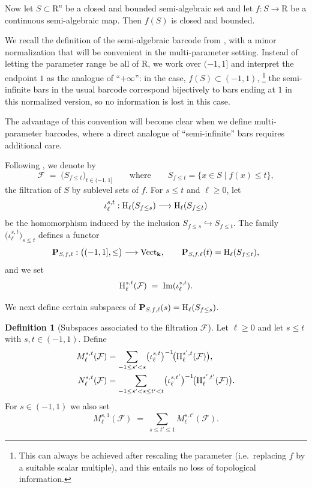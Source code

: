 \documentclass{amsart}[10pts]
\theoremstyle{definition}
\newtheorem{definition}{Definition}[section]
\theoremstyle{remark}
\theoremstyle{observation}
\numberwithin{equation}{section}
\newcommand {\R} {\mathrm{R}}
\newcommand {\kk}         {\mathbf{k}}
\newcommand{\HH}  {\mbox{\rm H}}
\newcommand{\Vect}{\mathrm{Vect}}
\begin{document}
\medskip
Now let $S\subset \R^n$ be a closed and bounded semi-algebraic set and let $f:S\to\R$ be a continuous semi-algebraic map.
Then $f(S)$ is closed and bounded. 

\medskip
We recall the definition of the semi-algebraic barcode from \cite{Basu-Karisani-2}, with a minor normalization that will be convenient in the multi-parameter setting.
Instead of letting the parameter range be all of $\R$, we work over $(-1,1]$ and interpret the endpoint $1$ as the analogue of ``$+\infty$'':
in the case, $f(S) \subset (-1,1)$, 
\footnote{
This can always be achieved after rescaling the parameter (i.e.\ replacing $f$ by a suitable scalar multiple),
and this entails no loss of topological information.} 
the
semi-infinite bars in the usual barcode correspond bijectively to bars ending at $1$ in this normalized version, so 
no information is lost in this case. 

\medskip
The advantage of this convention will become clear when we define multi-parameter barcodes, where a direct analogue of ``semi-infinite'' bars requires additional care.

\medskip
Following \cite{Basu-Karisani-2}, we denote by
\[
\mathcal F \;=\; \bigl(S_{f\le t}\bigr)_{t\in(-1,1]}
\qquad\text{where}\qquad
S_{f\le t}=\{x\in S \mid f(x)\le t\},
\]
the filtration of $S$ by sublevel sets of $f$.
For $s\le t$ and $\ell\ge 0$, let
\[
\iota_\ell^{s,t}:\HH_\ell(S_{f\le s}) \longrightarrow \HH_\ell(S_{f\le t})
\]
be the homomorphism induced by the inclusion $S_{f\le s}\hookrightarrow S_{f\le t}$.
The family $\bigl(\iota_\ell^{s,t}\bigr)_{s\le t}$ defines a functor
\[
\mathbf P_{S,f,\ell}:\bigl((-1,1],\le\bigr)\longrightarrow \Vect_{\kk},
\qquad
\mathbf P_{S,f,\ell}(t)=\HH_\ell(S_{f\le t}),
\]
and we set
\[
\HH_\ell^{s,t}(\mathcal F)\;=\;\mathrm{Im}(\iota_\ell^{s,t}).
\]

\medskip
We next define certain subspaces of $\mathbf P_{S,f,\ell}(s)=\HH_\ell(S_{f\le s})$.

\begin{definition}[Subspaces associated to the filtration $\mathcal F$]
\label{def:barcode}
Let $\ell\ge 0$ and let $s\le t$ with $s,t\in(-1,1)$.
Define
\begin{align*}
M^{s,t}_\ell(\mathcal F)
&=\sum_{-1\le s'<s}\bigl(\iota_\ell^{s,t}\bigr)^{-1}\!\bigl(\HH_\ell^{s',t}(\mathcal F)\bigr),\\
N^{s,t}_\ell(\mathcal F)
&=\sum_{-1\le s'<s\le t'<t}\bigl(\iota_\ell^{s,t'}\bigr)^{-1}\!\bigl(\HH_\ell^{s',t'}(\mathcal F)\bigr).
\end{align*}
For $s\in(-1,1)$ we also set
\[
M^{s,1}_\ell(\mathcal F)\;=\;\sum_{s\le t'\le 1} M^{s,t'}_\ell(\mathcal F).
\]
\end{definition}
\end{document}
